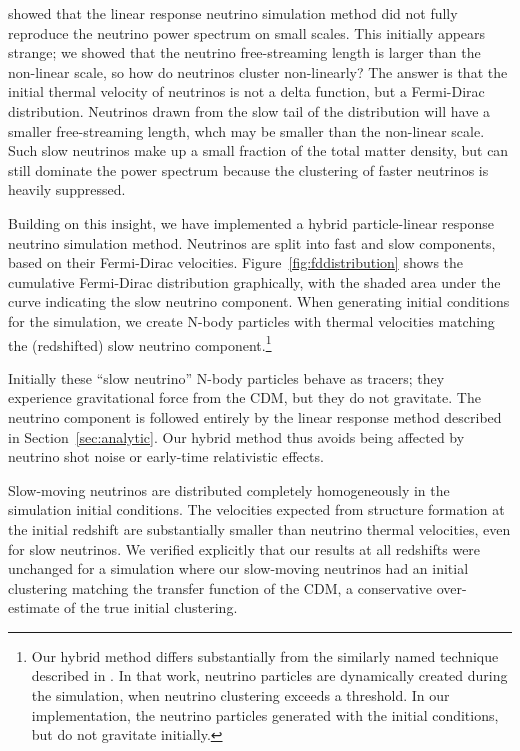 \documentclass[useAMS, usenatbib]{mnras}
\begin{document}
\cite{AHB} showed that the linear response neutrino simulation method did not fully reproduce the neutrino power spectrum on small scales. This initially appears strange; we showed that the neutrino free-streaming length is larger than the non-linear scale, so how do neutrinos cluster non-linearly? The answer is that the initial thermal velocity of neutrinos is not a delta function, but a Fermi-Dirac distribution. Neutrinos drawn from the slow tail of the distribution will have a smaller free-streaming length, whch may be smaller than the non-linear scale. Such slow neutrinos make up a small fraction of the total matter density, but can still dominate the power spectrum because the clustering of faster neutrinos is heavily suppressed.

Building on this insight, we have implemented a hybrid particle-linear response neutrino simulation method. Neutrinos are split into fast and slow components, based on their Fermi-Dirac velocities. Figure~\ref{fig:fddistribution} shows the cumulative Fermi-Dirac distribution graphically, with the shaded area under the curve indicating the slow neutrino component. When generating initial conditions for the simulation, we create N-body particles with thermal velocities matching the (redshifted) slow neutrino component.\footnote{Our hybrid method differs substantially from the similarly named technique described in \cite{Brandbyge_2010}. In that work, neutrino particles are dynamically created during the simulation, when neutrino clustering exceeds a threshold. In our implementation, the neutrino particles generated with the initial conditions, but do not gravitate initially.}

Initially these ``slow neutrino'' N-body particles behave as tracers; they experience gravitational force from the CDM, but they do not gravitate. The neutrino component is followed entirely by the linear response method described 
in Section~\ref{sec:analytic}. Our hybrid method thus avoids being affected by neutrino shot noise or early-time relativistic effects.

Slow-moving neutrinos are distributed completely homogeneously in the simulation initial conditions. The velocities expected from structure formation at the initial redshift are substantially smaller than neutrino thermal velocities, even for slow neutrinos. 
We verified explicitly that our results at all redshifts were unchanged for a simulation where our slow-moving neutrinos had an initial clustering matching the transfer function of the CDM, a conservative over-estimate of the true initial clustering.
\end{document}
